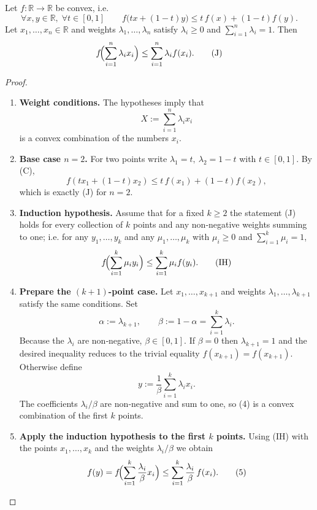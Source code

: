 \begin{theorem}
Let \(f:\mathbb{R}\to\mathbb{R}\) be convex, i.e.
\[
\forall x,y\in\mathbb{R},\;\forall t\in[0,1]\qquad
f\bigl(tx+(1-t)y\bigr)\le t\,f(x)+(1-t)f(y). \tag{C}
\]
Let \(x_{1},\dots,x_{n}\in\mathbb{R}\) and weights \(\lambda_{1},\dots,\lambda_{n}\) satisfy
\(\lambda_i\ge0\) and \(\sum_{i=1}^{n}\lambda_i=1\).
Then
\[
f\!\Bigl(\sum_{i=1}^{n}\lambda_i x_i\Bigr)
   \le \sum_{i=1}^{n}\lambda_i f(x_i). \tag{J}
\]
\end{theorem}

\begin{proof}
\begin{enumerate}
\item[\textbf{1.}] \textbf{Weight conditions.} The hypotheses imply that
\[
X:=\sum_{i=1}^{n}\lambda_i x_i
\]
is a convex combination of the numbers \(x_i\).

\item[\textbf{2.}] \textbf{Base case \(n=2\).}  For two points write
\(\lambda_{1}=t,\ \lambda_{2}=1-t\) with \(t\in[0,1]\).  By (C),
\[
f(t x_{1}+(1-t)x_{2})\le t\,f(x_{1})+(1-t)f(x_{2}),
\]
which is exactly (J) for \(n=2\).

\item[\textbf{3.}] \textbf{Induction hypothesis.}  Assume that for a fixed
\(k\ge2\) the statement (J) holds for every collection of \(k\) points and
any non‑negative weights summing to one; i.e. for any \(y_{1},\dots ,y_{k}\)
and any \(\mu_{1},\dots ,\mu_{k}\) with \(\mu_i\ge0\) and \(\sum_{i=1}^{k}\mu_i=1\),
\[
f\!\Bigl(\sum_{i=1}^{k}\mu_i y_i\Bigr)
   \le \sum_{i=1}^{k}\mu_i f(y_i). \tag{IH}
\]

\item[\textbf{4.}] \textbf{Prepare the \((k+1)\)-point case.}  Let
\(x_{1},\dots ,x_{k+1}\) and weights \(\lambda_{1},\dots ,\lambda_{k+1}\) satisfy the
same conditions.  Set
\[
\alpha:=\lambda_{k+1},\qquad
\beta:=1-\alpha=\sum_{i=1}^{k}\lambda_i .
\]
Because the \(\lambda_i\) are non‑negative, \(\beta\in[0,1]\).  If \(\beta=0\) then
\(\lambda_{k+1}=1\) and the desired inequality reduces to the trivial equality
\(f(x_{k+1})=f(x_{k+1})\).  Otherwise define
\[
y:=\frac{1}{\beta}\sum_{i=1}^{k}\lambda_i x_i . \tag{4}
\]
The coefficients \(\lambda_i/\beta\) are non‑negative and sum to one, so (4) is a convex
combination of the first \(k\) points.

\item[\textbf{5.}] \textbf{Apply the induction hypothesis to the first \(k\) points.}
Using (IH) with the points \(x_{1},\dots ,x_{k}\) and the weights
\(\lambda_i/\beta\) we obtain
\[
f(y)=f\!\Bigl(\sum_{i=1}^{k}\frac{\lambda_i}{\beta}x_i\Bigr)
   \le \sum_{i=1}^{k}\frac{\lambda_i}{\beta}\,f(x_i). \tag{5}
\]


\end{enumerate}
\end{proof}
